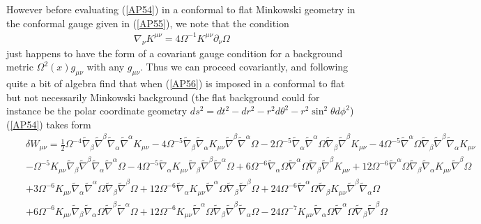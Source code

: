 \documentclass[aps]{revtex4}
\begin{document}
However before evaluating (\ref{AP54}) in  a conformal to flat Minkowski geometry in the conformal gauge given in (\ref{AP55}), we note that the condition 
%
\begin{eqnarray}
\nabla_{\nu}K^{\mu\nu}=4\Omega^{-1}K^{\mu\nu}\partial_{\nu}\Omega
\label{AP56}
\end{eqnarray}
% 
just happens to have the form of a covariant gauge condition for a background metric $\Omega^2(x) g_{\mu\nu}$ with any $g_{\mu\nu}$. Thus we can proceed covariantly, and following quite a bit of algebra find that when (\ref{AP56}) is imposed in a conformal to flat but not necessarily Minkowski background (the flat background could for instance be the polar coordinate geometry $ds^2=dt^2-dr^2-r^2d\theta^2-r^2\sin^2\theta d\phi^2$) (\ref{AP54}) takes  form
%
\begin{eqnarray}
&&\delta W_{\mu\nu}=\frac{1}{2}\Omega^{-4}\tilde{\nabla}_{\beta}\tilde{\nabla}^{\beta}\tilde{\nabla}_{\alpha}\tilde{\nabla}^{\alpha}K_{\mu \nu}-  4\Omega^{-5} \tilde{\nabla}_{\beta}\tilde{\nabla}_{\alpha}K_{\mu \nu} \tilde{\nabla}^{\beta}\tilde{\nabla}^{\alpha}\Omega- 2\Omega^{-5}  \tilde{\nabla}_{\alpha}\tilde{\nabla}^{\alpha}\Omega \tilde{\nabla}_{\beta}\tilde{\nabla}^{\beta}K_{\mu \nu}-  4 \Omega^{-5}\tilde{\nabla}^{\alpha}\Omega \tilde{\nabla}_{\beta}\tilde{\nabla}^{\beta}\tilde{\nabla}_{\alpha}K_{\mu \nu}  
\nonumber\\
&&-  \Omega^{-5}K_{\mu \nu} \tilde{\nabla}_{\beta}\tilde{\nabla}^{\beta}\tilde{\nabla}_{\alpha}\tilde{\nabla}^{\alpha}\Omega -  4\Omega^{-5} \tilde{\nabla}_{\alpha}K_{\mu \nu} \tilde{\nabla}_{\beta}\tilde{\nabla}^{\beta}\tilde{\nabla}^{\alpha}\Omega + 6\Omega^{-6} \tilde{\nabla}_{\alpha}\Omega \tilde{\nabla}^{\alpha}\Omega \tilde{\nabla}_{\beta}\tilde{\nabla}^{\beta}K_{\mu \nu} + 12\Omega^{-6} \tilde{\nabla}^{\alpha}\Omega \tilde{\nabla}_{\beta}\tilde{\nabla}_{\alpha}K_{\mu \nu} \tilde{\nabla}^{\beta}\Omega
\nonumber\\
&&+ 3\Omega^{-6} K_{\mu \nu} \tilde{\nabla}_{\alpha}\tilde{\nabla}^{\alpha}\Omega \tilde{\nabla}_{\beta}\tilde{\nabla}^{\beta}\Omega + 12 \Omega^{-6}\tilde{\nabla}_{\alpha}K_{\mu \nu} \tilde{\nabla}^{\alpha}\Omega \tilde{\nabla}_{\beta}\tilde{\nabla}^{\beta}\Omega+ 24\Omega^{-6}  \tilde{\nabla}^{\alpha}\Omega \tilde{\nabla}_{\beta}K_{\mu \nu} \tilde{\nabla}^{\beta}\tilde{\nabla}_{\alpha}\Omega 
\nonumber\\
&&+ 6\Omega^{-6} K_{\mu \nu} \tilde{\nabla}_{\beta}\tilde{\nabla}_{\alpha}\Omega \tilde{\nabla}^{\beta}\tilde{\nabla}^{\alpha}\Omega 
+ 12\Omega^{-6} K_{\mu \nu} \tilde{\nabla}^{\alpha}\Omega \tilde{\nabla}_{\beta}\tilde{\nabla}^{\beta}\tilde{\nabla}_{\alpha}\Omega -  24 \Omega^{-7}K_{\mu \nu} \tilde{\nabla}_{\alpha}\Omega \tilde{\nabla}^{\alpha}\Omega \tilde{\nabla}_{\beta}\tilde{\nabla}^{\beta}\Omega 

\end{eqnarray}
\end{document}
